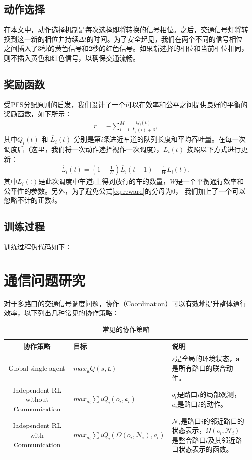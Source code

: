 \subsection*{动作选择}
在本文中，动作选择机制是每次选择即将转换的信号相位。之后，交通信号灯将转换到这一新的相位并持续$\Delta t$的时间。为了安全起见，我们在两个不同的信号相位之间插入了3秒的黄色信号和2秒的红色信号。如果新选择的相位和当前相位相同，则不插入黄色和红色信号，以确保交通流畅。
\subsection*{奖励函数}
受PFS分配原则的启发，我们设计了一个可以在效率和公平之间提供良好的平衡的奖励函数，如下所示：
\begin{align}
\label{eq:reward}
    r = -\sum_{i=1}^{M} \frac{Q_i(t)}{\overline{L}_i(t) + \delta},
\end{align}
其中$Q_i(t)$ 和 $\overline{L}_i(t)$ 分别是第$i$条进近车道的队列长度和平均吞吐量。在每一次调度后（这里，我们将一次动作选择视作一次调度），$\overline{L}_i(t)$ 按照以下方式进行更新：
\begin{align}
    \overline{L}_i(t) = (1-\frac{1}{W})\overline{L}_i(t-1) + \frac{1}{W}L_i(t),
\end{align}
其中$L_i(t)$是此次调度中车道$i$上得到放行的车的数量，$W$是一个平衡通行效率和公平性的参数。另外，为了避免公式\ref{eq:reward}的分母为0， 我们加上了一个可以忽略不计的正数$\delta$。
\subsection*{训练过程}
训练过程伪代码如下：

\section{通信问题研究}
对于多路口的交通信号调度问题，协作（Coordination）可以有效地提升整体通行效率，以下列出几种常见的协作策略：
\begin{table}[htb]
    \caption[协作策略]{常见的协作策略\label{tab:coordination}}
    \begin{tabular}{clp{}}
      \toprule
      协作策略 & 目标 & 说明 \\
      \midrule
      Global single agent & $max_{\mathbf{a}}Q(s, \mathbf{a})$ & $s$是全局的环境状态，$\mathbf{a}$是所有路口的联合动作。\\
      Independent RL without Communication & $max_{a_{i}}\sum{i}Q_{i}(o_i, a_i)$ & $o_i$是路口$i$的局部观测，$a_i$是路口$i$的动作。\\
      Independent RL with Communication & $max_{a_i}\sum{i}Q_i(\Omega(o_i, \mathcal{N}_i), a_i)$ &$\mathcal{N}_i$是路口$i$的邻近路口的状态表示，$\Omega(o_i, \mathcal{N}_i)$是整合路口$i$及其邻近路口状态表示的函数。\\
      \bottomrule
    \end{tabular}
\end{table}

